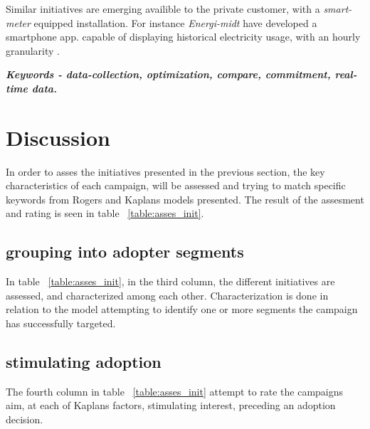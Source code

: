 \documentclass[journal]{IEEEtran}
\begin{document}
Similar initiatives are emerging availible to the private customer, with a \textit{smart-meter} equipped installation. For instance \textit{Energi-midt} have developed a smartphone app. capable of displaying historical electricity usage, with an hourly granularity \cite{em_app}. \newline

\textbf{\textit{Keywords - data-collection, optimization, compare, commitment, real-time data.}}

\section{Discussion}
In order to asses the initiatives presented in the previous section, the key characteristics of each campaign, will be assessed and trying to match specific keywords from Rogers and Kaplans models presented.
The result of the assesment and rating is seen in table ~\ref{table:asses_init}.

\subsection{grouping into adopter segments}
In table ~\ref{table:asses_init}, in the third column, the different initiatives are assessed, and characterized among each other. Characterization is done in relation to the model attempting to identify one or more segments the campaign has successfully targeted. 

\subsection{stimulating adoption}
The fourth column in table ~\ref{table:asses_init} attempt to rate the campaigns aim, at each of Kaplans factors, stimulating interest, preceding an adoption decision.
\end{document}
